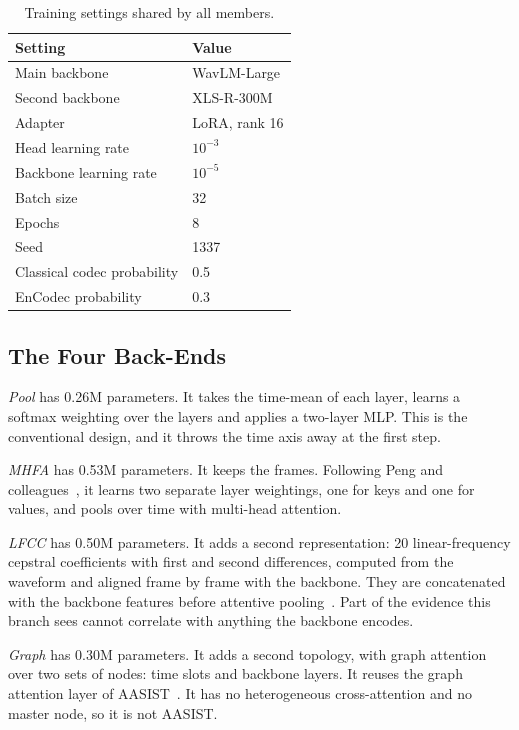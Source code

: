 \documentclass[twocolumn,a4paper,11pt]{article}
\begin{document}
\begin{table}[t]
\centering
\caption{Training settings shared by all members.}
\label{tab:recipe}
\small
\begin{tabular}{ll}
\toprule
Setting & Value \\
\midrule
Main backbone & WavLM-Large \\
Second backbone & XLS-R-300M \\
Adapter & LoRA, rank 16 \\
Head learning rate & $10^{-3}$ \\
Backbone learning rate & $10^{-5}$ \\
Batch size & 32 \\
Epochs & 8 \\
Seed & 1337 \\
Classical codec probability & 0.5 \\
EnCodec probability & 0.3 \\
\bottomrule
\end{tabular}
\end{table}

\subsection{The Four Back-Ends}

\textit{Pool} has 0.26M parameters. It takes the time-mean of each layer,
learns a softmax weighting over the layers and applies a two-layer MLP. This is
the conventional design, and it throws the time axis away at the first step.

\textit{MHFA} has 0.53M parameters. It keeps the frames. Following Peng and
colleagues~\cite{mhfa}, it learns two separate layer weightings, one for keys
and one for values, and pools over time with multi-head attention.

\textit{LFCC} has 0.50M parameters. It adds a second representation: 20
linear-frequency cepstral coefficients with first and second differences,
computed from the waveform and aligned frame by frame with the backbone. They
are concatenated with the backbone features before attentive
pooling~\cite{attentive_pool}. Part of the evidence this branch sees cannot
correlate with anything the backbone encodes.

\textit{Graph} has 0.30M parameters. It adds a second topology, with graph
attention over two sets of nodes: time slots and backbone layers. It reuses
the graph attention layer of AASIST~\cite{aasist}. It has no heterogeneous
cross-attention and no master node, so it is not AASIST.
\end{document}
